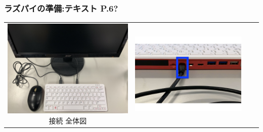 \documentclass[dvipdfmx]{beamer}
\begin{document}
\begin{frame}[fragile]
	\frametitle{ラズパイの準備:テキスト P.6?~~~}

	\begin{tabular}{cccc}
		\begin{minipage}{0.23\textwidth}
    {\upshape
      \includegraphics[width=\textwidth]{connections01-2023.jpg}
      \newline
			接続 全体図}
			\end{minipage} &
			\begin{minipage}{0.23\textwidth}
                    {\upshape
                      \includegraphics[width=\textwidth]{figure222023.pdf}
}
\end{minipage}
\end{tabular}
\end{frame}
\end{document}
